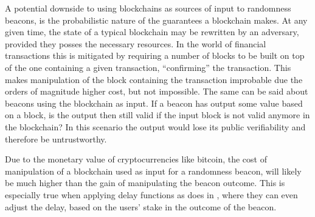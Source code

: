 A potential downside to using blockchains as sources of input to randomness beacons, is the probabilistic nature of the guarantees a blockchain makes.
At any given time, the state of a typical blockchain may be rewritten by an adversary, provided they posses the necessary resources.
In the world of financial transactions this is mitigated by requiring a number of blocks to be built on top of the one containing a given transaction, \enquote{confirming} the transaction.
This makes manipulation of the block containing the transaction improbable due the orders of magnitude higher cost, but not impossible.
The same can be said about beacons using the blockchain as input.
If a beacon has output some value based on a block, is the output then still valid if the input block is not valid anymore in the blockchain?
In this scenario the output would lose its public verifiability and therefore be untrustworthy.

Due to the monetary value of cryptocurrencies like bitcoin, the cost of manipulation of a blockchain used as input for a randomness beacon, will likely be much higher than the gain of manipulating the beacon outcome.
This is especially true when applying delay functions as \citet{bunz2017proofsof} does in , where they can even adjust the delay, based on the users' stake in the outcome of the beacon.


